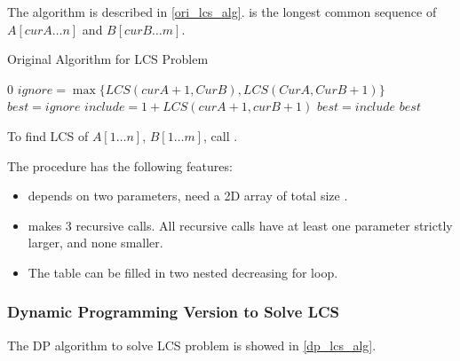 The algorithm is described in \cref{ori_lcs_alg}.
 is the longest common sequence of
$A[curA \ldots n]$ and $B[curB \ldots m]$.
\begin{algorithm}[H]
\caption{Original Algorithm for LCS Problem}\label{ori_lcs_alg}
\begin{algorithmic}[1]
            \Return $0$
        \EndIf
        \State $ignore = \max\{LCS(curA+1, CurB), LCS(CurA, CurB+1)\}$
        \State $best = ignore$
            \State $include = 1 + LCS(curA+1, curB+1)$
                \State $best = include$
            \EndIf
        \EndIf
        \Return $best$
    \EndProcedure
\end{algorithmic}
\end{algorithm}

To find LCS of $A[1 \ldots n]$, $B[1 \ldots m]$, call .

\observation

The procedure  has the following features:

\begin{itemize}
    \item {} depends on two parameters,
        need a 2D array of total size .
    \item {} makes 3 recursive calls.
        All recursive calls have at least one parameter strictly
        larger, and none smaller.
    \item The table can be filled in two nested decreasing for loop.
\end{itemize}

\subsubsection{Dynamic Programming Version to Solve LCS}

The DP algorithm to solve LCS problem is showed in \cref{dp_lcs_alg}.



